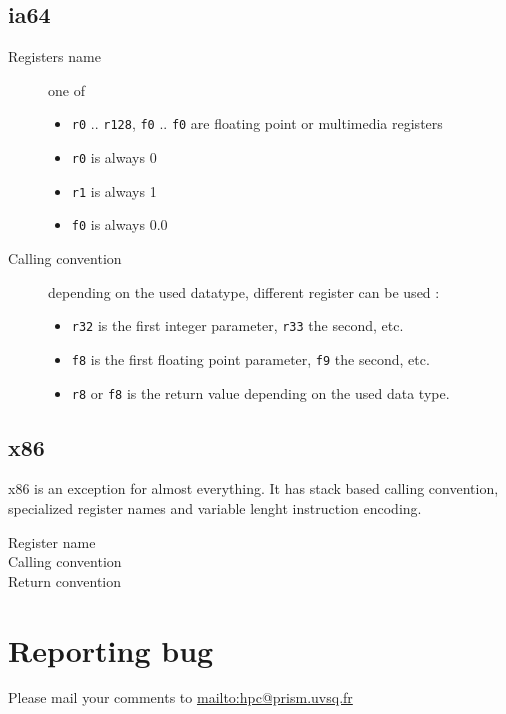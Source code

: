 \documentclass{article}
\begin{document}
\subsection{ia64}

\begin{description}
\item[Registers name] one of
  \begin{itemize}
  \item \verb|r0| .. \verb|r128|, \verb|f0| .. \verb|f0| are floating
    point or multimedia registers
  \item \verb|r0| is always 0
  \item \verb|r1| is always 1
  \item \verb|f0| is always 0.0
  \end{itemize}
\item[Calling convention] depending on the used datatype, different
  register can be used :
  \begin{itemize}
  \item \verb|r32| is the first integer parameter, \verb|r33| the
    second, etc.
  \item \verb|f8| is the first floating point parameter, \verb|f9| the
    second, etc.
  \item \verb|r8| or \verb|f8| is the return value depending on the
    used data type.
  \end{itemize}
\end{description}

\subsection{x86}

x86 is an exception for almost everything. It has stack based calling
convention, specialized register names and variable lenght instruction
encoding.

\begin{description}
\item[Register name]
\item[Calling convention]
\item[Return convention] 
\end{description}

\section{Reporting bug}

Please mail your comments to \url{mailto:hpc@prism.uvsq.fr}



\end{document}
